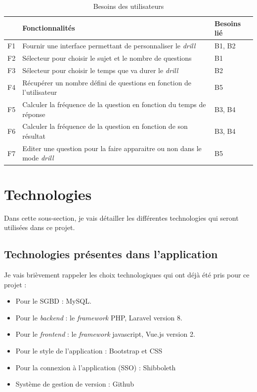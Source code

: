 \begin{table}[h]
    \begin{center}
        \caption{Besoins des utilisateurs \label{Besoins}}
        \begin{tabular}{|l|l|l|}
            \hline
            \textbf{} & \textbf{Fonctionnalités}                                                      & \textbf{Besoins lié} \\
            \hline
            F1        & Fournir une interface permettant de personnaliser le \emph{drill}             & B1, B2               \\
            \hline
            F2        & Sélecteur pour choisir le sujet et le nombre de questions                     & B1                   \\
            \hline
            F3        & Sélecteur pour choisir le temps que va durer le \emph{drill}                  & B2                   \\
            \hline
            F4        & Récupérer un nombre défini de questions en fonction de l'utilisateur          & B5                   \\
            \hline
            F5        & Calculer la fréquence de la question en fonction du temps de réponse          & B3, B4               \\
            \hline
            F6        & Calculer la fréquence de la question en fonction de son résultat              & B3, B4               \\
            \hline
            F7        & Editer une question pour la faire apparaitre ou non dans le mode \emph{drill} & B5                   \\
            \hline
        \end{tabular}
    \end{center}
\end{table}



\section{Technologies}
Dans cette sous-section, je vais détailler les différentes technologies qui seront utilisées dans ce projet.
\subsection{Technologies présentes dans l'application}
Je vais brièvement rappeler les choix technologiques qui ont déjà été pris pour ce projet :
\begin{itemize}
    \item Pour le SGBD : MySQL.
    \item Pour le \emph{backend} : le \emph{framework} PHP, Laravel version 8.
    \item Pour le \emph{frontend} : le \emph{framework} javascript, Vue.js version 2.
    \item Pour le style de l'application : Bootstrap et CSS
    \item Pour la connexion à l'application (SSO) : Shibboleth
    \item Système de gestion de version : Github
\end{itemize}


